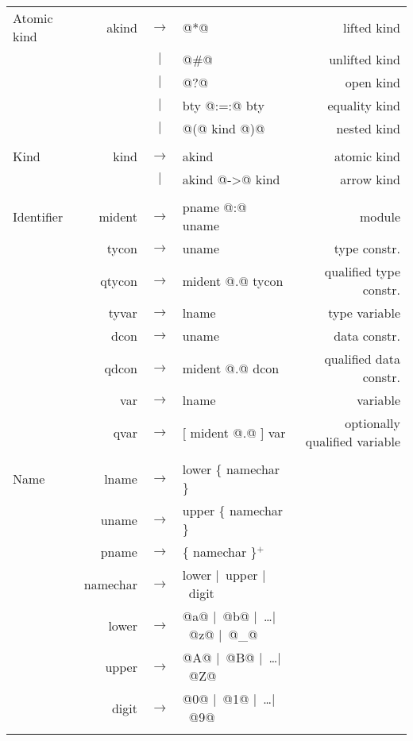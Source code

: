 \documentclass[10pt]{article}
\newcommand{\derives}{\mbox{$\rightarrow$}}
\newcommand{\orderives}{\mbox{$\mid$}}
\newcommand{\many}[1]{\{ {#1} \}}
\newcommand{\oneormore}[1]{\{ {#1} \}$^{+}$}
\begin{document}
{\begin{tabular}{lrclr}
{\rm Atomic kind} & akind & \derives &   @*@ &				{\rm lifted kind}\\
		& 	& \orderives &	 @#@ &				{\rm unlifted kind}\\
		& 	& \orderives &   @?@ &				{\rm open kind}\\
                &    &        \orderives &    bty @:=:@ bty      &      {\rm equality kind} \\
		& 	& \orderives &   @(@ kind @)@&			{\rm nested kind}\\
\\
{\rm Kind} &	kind &	 \derives &	 akind & 			{\rm atomic kind}\\
 	   &	&	 \orderives &	 akind @->@ kind 	 &	{\rm arrow kind} \\
\\
{\rm Identifier}	&	mident & \derives & pname @:@ uname &	{\rm module} \\
	&	tycon &	 \derives &	 uname &	 	{\rm type constr.}  \\
 	&	qtycon & \derives &	 mident @.@  tycon &	{\rm qualified type constr.} \\
	&	tyvar &	 \derives &	 lname &		{\rm type variable} \\
	&	dcon &	 \derives &	 uname &	 	{\rm data constr.} \\
	&	qdcon &	 \derives &	 mident @.@  dcon & 	{\rm qualified data constr.} \\
        &	var &	 \derives &	 lname &		{\rm variable} \\
	&	qvar &	 \derives &	 [ mident @.@ ] var &	{\rm optionally qualified variable} \\
\\
{\rm Name} 	&	lname  &  \derives & 	 lower \many{namechar} \\
 	&       uname &  \derives & 	 upper \many{namechar} & \\
	&       pname &  \derives & 	 \oneormore{namechar} & \\
	&	namechar & \derives &	 lower \orderives\  upper \orderives\  digit \\
	&	lower &  \derives &      @a@ \orderives\  @b@ \orderives\  \ldots \orderives\  @z@ \orderives\  @_@ \\
	&	upper &  \derives &      @A@ \orderives\  @B@ \orderives\  \ldots \orderives\  @Z@ \\
	& 	digit &  \derives & 	 @0@ \orderives\  @1@ \orderives\  \ldots \orderives\  @9@ \\
\\
\end{tabular}
}
\end{document}
